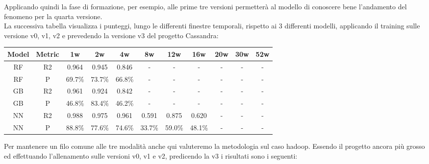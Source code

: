 \documentclass[%
    corpo=12pt,
    twoside,
    oldstyle,
    autoretitolo,
    greek,
    evenboxes,
]{toptesi}
\begin{document}
Applicando quindi la fase di formazione, per esempio, alle prime tre versioni permetterà al modello di conoscere bene l'andamento del fenomeno per la quarta versione.\\
La successiva tabella visualizza i punteggi, lungo le differenti finestre temporali, rispetto ai 3 differenti modelli, applicando il training sulle versione v0, v1, v2 e prevedendo la versione v3 del progetto Cassandra:
\begin{center}
   \label{tab:cross_version_cassandra}
  \begin{tabular}{ |c|c|c|c|c|c|c|c|c|c|c| }
    \hline
    \textbf{Model} & \textbf{Metric} & \textbf{1w} & \textbf{2w} & \textbf{4w} & \textbf{8w} & \textbf{12w} & \textbf{16w} & \textbf{20w} & \textbf{30w}  & \textbf{52w} \\
    \hline
    \hline
    RF & R2 & 0.964 & 0.945 & 0.846 & - & - & - & - & - & -\\
    \hline
    RF & P & 69.7\% & 73.7\% & 66.8\% & - & - & - & - & - & -\\
    \hline
    \hline
    GB & R2 & 0.961 & 0.924 & 0.842 & - & - & - & - & - & -\\
    \hline
    GB & P & 46.8\% & 83.4\% & 46.2\% & - & - & - & - & - & -\\
    \hline
    \hline
    NN & R2 & 0.988 & 0.975 & 0.961 & 0.591 & 0.875 & 0.620 & - & - & -\\
    \hline
    NN & P & 88.8\% & 77.6\% & 74.6\% & 33.7\% & 59.0\% & 48.1\% & - & - & -\\
    \hline
  \end{tabular}
\end{center}
Per mantenere un filo comune alle tre modalità anche qui valuteremo la metodologia sul caso hadoop. Essendo il progetto ancora più grosso ed effettuando l'allenamento sulle versioni v0, v1 e v2, predicendo la v3 i risultati sono i seguenti:
\end{document}

